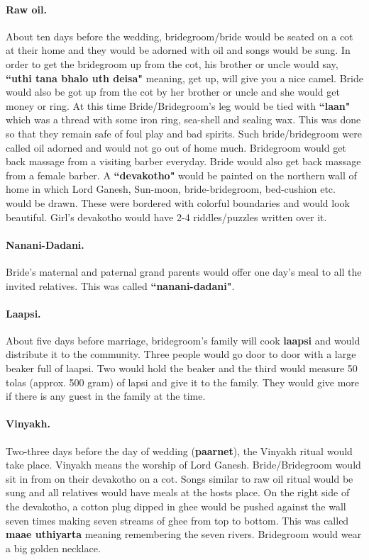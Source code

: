 \paragraph{Raw oil.} About ten days before the wedding, bridegroom/bride would be
seated on a cot at their home and they would be adorned with oil and songs
would be sung. In order to get the bridegroom up from the cot, his brother or uncle
would say, \textbf{``uthi tana bhalo uth deisa"} meaning, get up, will give you
a nice camel. Bride would also be got up from the cot by her brother or uncle
and she would get money or ring. At this time Bride/Bridegroom's leg would be tied
with \textbf{``laan"} which was a thread with some iron ring, sea-shell and
sealing wax. This was done so that they remain safe of foul play and bad
spirits. Such bride/bridegroom were called oil adorned and would not go out of home
much. Bridegroom would get back massage from a visiting barber everyday. Bride would
also get back massage from a female barber. A \textbf{``devakotho"} would be
painted on the northern wall of home in which Lord Ganesh, Sun-moon,
bride-bridegroom, bed-cushion etc. would be drawn. These were bordered with colorful
boundaries and would look beautiful. Girl's devakotho would have 2-4
riddles/puzzles written over it.

\paragraph{Nanani-Dadani.} Bride's maternal and paternal grand parents would
offer one day's meal to all the invited relatives. This was called
\textbf{``nanani-dadani"}.

\paragraph{Laapsi.} About five days before marriage, bridegroom's family will cook
\textbf{laapsi} and would distribute it to the community. Three people would go
door to door with a large beaker full of laapsi. Two would hold the beaker and
the third would measure 50 tolas (approx. 500 gram) of lapsi and give it to the
family. They would give more if there is any guest in the family at the time.

\paragraph{Vinyakh.} Two-three days before the day of wedding (\textbf{paarnet}),
the Vinyakh ritual would take place. Vinyakh means the worship of Lord Ganesh.
Bride/Bridegroom would sit in from on their devakotho on a cot. Songs similar to raw
oil ritual would be sung and all relatives would have meals at the hosts place.
On the right side of the devakotho, a cotton plug dipped in ghee would be
pushed against the wall seven times making seven streams of ghee from top to
bottom. This was called \textbf{maae uthiyarta} meaning remembering the seven
rivers. Bridegroom would wear a big golden necklace.  

